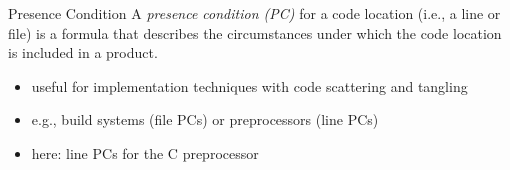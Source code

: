 \begin{frame}[b,fragile]{\myframetitle}
	\vspace*{-3ex}
	\begin{fancycolumns}[t,columns=3,widths={40,23,37},animation=none]
		\begin{definition}{Presence Condition}
			A \emph{presence condition (PC)} for a code location (i.e., a line or file) is a formula that describes the circumstances under which the code location is included in a product.
		\end{definition}
		\begin{note}{}
			\begin{itemize}
				\item useful for implementation techniques with code scattering and tangling
				\item e.g., build systems (file PCs) or preprocessors (line PCs)
				\item here: line PCs for the C preprocessor
			\end{itemize}
		\end{note}
	\nextcolumn
\end{fancycolumns}
\end{frame}
